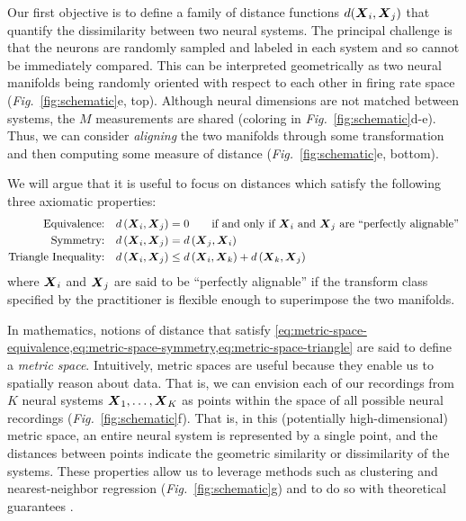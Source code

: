 Our first objective is to define a family of distance functions $d(\boldsymbol{X}_i, \boldsymbol{X}_j)$ that quantify the dissimilarity between two neural systems.
The principal challenge is that the neurons are randomly sampled and labeled in each system and so cannot be immediately compared.
This can be interpreted geometrically as two neural manifolds being randomly oriented with respect to each other in firing rate space (\textit{Fig.}~\ref{fig:schematic}e, top).
Although neural dimensions are not matched between systems, the $M$ measurements are shared (coloring in \textit{Fig.}~\ref{fig:schematic}d-e).
Thus, we can consider \textit{aligning} the two manifolds through some transformation and then computing some measure of distance (\textit{Fig.}~\ref{fig:schematic}e, bottom). 

We will argue that it is useful to focus on distances which satisfy the following three axiomatic properties:
\begin{align}
\label{eq:metric-space-equivalence}
\text{Equivalence:} & \quad d\left(\boldsymbol{X}_i, \boldsymbol{X}_j\right)=0 \qquad \text{if and only if $\boldsymbol{X}_i$ and $\boldsymbol{X}_j$ are ``perfectly alignable''}\\
\label{eq:metric-space-symmetry}
\text{Symmetry:} & \quad d\left(\boldsymbol{X}_i, \boldsymbol{X}_j \right) =d\left(\boldsymbol{X}_j, \boldsymbol{X}_i \right)\\
\label{eq:metric-space-triangle}
\text{Triangle Inequality:} & \quad d\left(\boldsymbol{X}_i, \boldsymbol{X}_j \right) \leq d\left(\boldsymbol{X}_i, \boldsymbol{X}_k \right) + d\left(\boldsymbol{X}_k, \boldsymbol{X}_j \right)
\end{align}
where $\boldsymbol{X}_i$ and $\boldsymbol{X}_j$ are said to be ``perfectly alignable'' if the transform class specified by the practitioner is flexible enough to superimpose the two manifolds.

In mathematics, notions of distance that satisfy \cref{eq:metric-space-equivalence,eq:metric-space-symmetry,eq:metric-space-triangle} are said to define a \textit{metric space}.
Intuitively, metric spaces are useful because they enable us to spatially reason about data.
That is, we can envision each of our recordings from $K$ neural systems $\boldsymbol{X}_1, \dots, \boldsymbol{X}_K$ as points within the space of all possible neural recordings (\textit{Fig.}~\ref{fig:schematic}f).
That is, in this (potentially high-dimensional) metric space, an entire neural system is represented by a single point, and the distances between points indicate the geometric similarity or dissimilarity of the systems.   
These properties allow us to leverage methods such as clustering and nearest-neighbor regression (\textit{Fig.}~\ref{fig:schematic}g) and to do so with theoretical guarantees \parencite[see e.g.][]{Cover1967,Dasgupta2005}.

